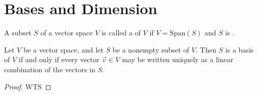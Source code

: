 \documentclass[11pt,fleqn]{book} %
\begin{document}
\section{Bases and Dimension}

\begin{definition}[Basis]
    A subset $S$ of a vector space $V$ is called a  of $V$ if $V = \mathrm{Span}(S)$ and $S$ is .
\end{definition}

\setcounter{dummy}{2}
\begin{theorem}
    Let $V$ be a vector space, and let $S$ be a nonempty subset of $V$. Then $S$ is a basis of $V$ if and only if every vector $\vec{v} \in V$ may be written uniquely as a linear combination of the vectors in $S$. 
\end{theorem}

\begin{proof}
    WTS
\end{proof}
\end{document}
